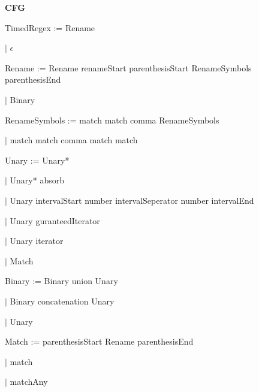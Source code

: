
\textbf{CFG}

TimedRegex := Rename

\qquad	$\mid$ $\epsilon$

Rename := Rename renameStart parenthesisStart RenameSymbols parenthesisEnd

\qquad $\mid$ Binary

RenameSymbols := match match comma RenameSymbols

\qquad $\mid$ match match comma match match

Unary := Unary*

\qquad $\mid$ Unary* absorb

\qquad $\mid$ Unary intervalStart number intervalSeperator number intervalEnd

\qquad $\mid$ Unary guranteedIterator

\qquad $\mid$ Unary iterator

\qquad $\mid$ Match

Binary := Binary union Unary

\qquad $\mid$ Binary concatenation Unary

\qquad $\mid$ Unary

Match := parenthesisStart Rename parenthesisEnd

\qquad $\mid$ match

\qquad $\mid$ matchAny

